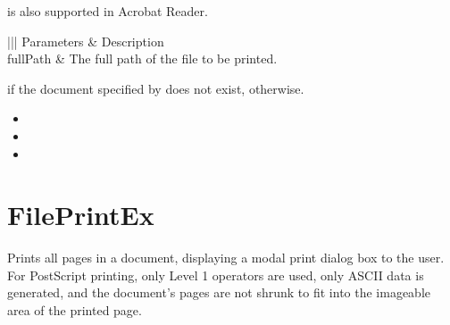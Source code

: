 \documentclass[letterpaper,12pt,english,openany,oneside]{sphinxmanual}
\begin{document}
 is also supported in Acrobat Reader.


\begin{sphinxVerbatim}[commandchars=\\\{\}]
\PYG{p}{[} \PYG{p}{]}
\end{sphinxVerbatim}
\label{\detokenize{IAC_API_DDE_Messages:parameters-20}}


\begin{savenotes}\sphinxattablestart
\centering
{}\label{\detokenize{IAC_API_DDE_Messages:section-20}}\nobreak
\begin{tabular}[t]{|||}
\hline
\sphinxstyletheadfamily 
Parameters
&\sphinxstyletheadfamily 
Description
\\
\hline
fullPath
&
The full path of the file to be printed.
\\
\hline
\end{tabular}
\par
\sphinxattableend\end{savenotes}


 if the document specified by  does not exist,  otherwise.

\label{\detokenize{IAC_API_DDE_Messages:related-methods-20}}
\begin{itemize}
\item {} 

\item {} 

\item {} 

\end{itemize}




\section{FilePrintEx}
\label{\detokenize{IAC_API_DDE_Messages:id39}}
Prints all pages in a document, displaying a modal print dialog box to the user. For PostScript printing, only Level 1 operators are used, only ASCII data is generated, and the document’s pages are not shrunk to fit into the imageable area of the printed page.
\end{document}
